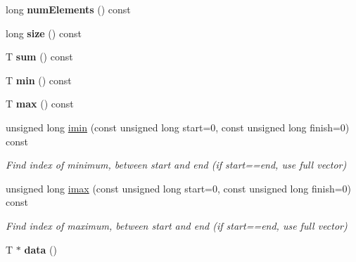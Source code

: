 \begin{DoxyCompactItemize}
\item 
\mbox{\label{class_cryst_vector_a0269e971daefef3d3f63129c17089b38}} 
long {\bfseries num\+Elements} () const
\item 
\mbox{\label{class_cryst_vector_a106551b06a3ce47949611683d94981ab}} 
long {\bfseries size} () const
\item 
\mbox{\label{class_cryst_vector_a6c648fc831631be72c1bee74dc79639c}} 
T {\bfseries sum} () const
\item 
\mbox{\label{class_cryst_vector_a5623edf7706665fc067a6cb00bf6cc24}} 
T {\bfseries min} () const
\item 
\mbox{\label{class_cryst_vector_ac2918765398b102d68c0446fdf3c1bea}} 
T {\bfseries max} () const
\item 
\mbox{\label{class_cryst_vector_a8d5e6eef9202504b306ca7b691162baf}} 
unsigned long \mbox{\hyperlink{class_cryst_vector_a8d5e6eef9202504b306ca7b691162baf}{imin}} (const unsigned long start=0, const unsigned long finish=0) const
\begin{DoxyCompactList}\small\item\em Find index of minimum, between start and end (if start==end, use full vector) \end{DoxyCompactList}\item 
\mbox{\label{class_cryst_vector_a5a30304d5f29ab47d499e59003a05a11}} 
unsigned long \mbox{\hyperlink{class_cryst_vector_a5a30304d5f29ab47d499e59003a05a11}{imax}} (const unsigned long start=0, const unsigned long finish=0) const
\begin{DoxyCompactList}\small\item\em Find index of maximum, between start and end (if start==end, use full vector) \end{DoxyCompactList}\item 
\mbox{\label{class_cryst_vector_a076edfa99371c4c9cae3d400f7547f30}} 
T $\ast$ {\bfseries data} ()
\item 
\mbox{\label{class_cryst_vector_a5fd0fe70250d6b3b31d4b2d2e41f61f7}} 

\end{DoxyCompactItemize}
